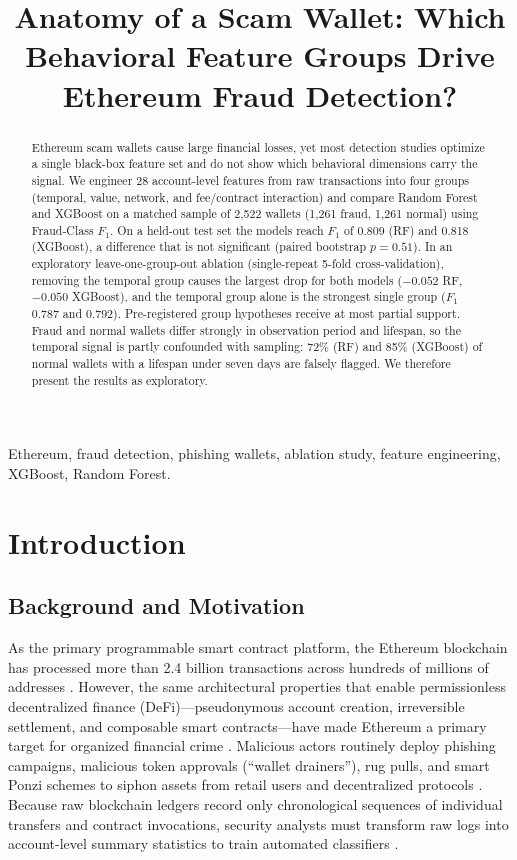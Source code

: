 \documentclass[conference]{IEEEtran}
\title{Anatomy of a Scam Wallet: Which Behavioral Feature Groups Drive Ethereum Fraud Detection?}
\author{
\IEEEauthorblockN{Ahmad Azad, Qasim Tanveer}
\IEEEauthorblockA{Department of Data Science\\
FAST National University of Computer and Emerging Sciences (FAST NUCES)\\
Lahore, Pakistan}
}
\begin{document}
\maketitle

\begin{abstract}
Ethereum scam wallets cause large financial losses, yet most detection studies optimize a single black-box feature set and do not show which behavioral dimensions carry the signal. We engineer 28 account-level features from raw transactions into four groups (temporal, value, network, and fee/contract interaction) and compare Random Forest and XGBoost on a matched sample of 2,522 wallets (1,261 fraud, 1,261 normal) using Fraud-Class $F_1$. On a held-out test set the models reach $F_1$ of 0.809 (RF) and 0.818 (XGBoost), a difference that is not significant (paired bootstrap $p=0.51$). In an exploratory leave-one-group-out ablation (single-repeat 5-fold cross-validation), removing the temporal group causes the largest drop for both models ($-0.052$ RF, $-0.050$ XGBoost), and the temporal group alone is the strongest single group ($F_1$ 0.787 and 0.792). Pre-registered group hypotheses receive at most partial support. Fraud and normal wallets differ strongly in observation period and lifespan, so the temporal signal is partly confounded with sampling: 72\% (RF) and 85\% (XGBoost) of normal wallets with a lifespan under seven days are falsely flagged. We therefore present the results as exploratory.
\end{abstract}

\begin{IEEEkeywords}
Ethereum, fraud detection, phishing wallets, ablation study, feature engineering, XGBoost, Random Forest.
\end{IEEEkeywords}

\section{Introduction}

\subsection{Background and Motivation}
As the primary programmable smart contract platform, the Ethereum blockchain has processed more than 2.4 billion transactions across hundreds of millions of addresses \cite{chithanuru2025}. However, the same architectural properties that enable permissionless decentralized finance (DeFi)---pseudonymous account creation, irreversible settlement, and composable smart contracts---have made Ethereum a primary target for organized financial crime \cite{wu2020, chen2020toit}. Malicious actors routinely deploy phishing campaigns, malicious token approvals (``wallet drainers''), rug pulls, and smart Ponzi schemes to siphon assets from retail users and decentralized protocols \cite{bartoletti2020, chen2021}. Because raw blockchain ledgers record only chronological sequences of individual transfers and contract invocations, security analysts must transform raw logs into account-level summary statistics to train automated classifiers \cite{farrugia2020, gu2025}.
\end{document}
